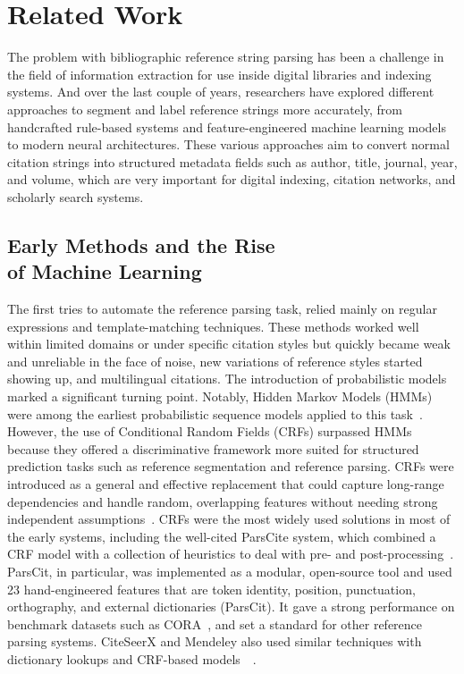 \chapter{Related Work}
\label{ch:related}

The problem with bibliographic reference string parsing has been a challenge in the field of information extraction for use inside digital libraries and indexing systems. And over the last couple of years, researchers have explored different approaches to segment and label reference strings more accurately, from handcrafted rule-based systems and feature-engineered machine learning models to modern neural architectures. These various approaches aim to convert normal citation strings into structured metadata fields such as author, title, journal, year, and volume, which are very important for digital indexing, citation networks, and scholarly search systems.

\section[Early Methods and the Rise of Machine Learning]{Early Methods and the Rise\\ of Machine Learning}
The first tries to automate the reference parsing task, relied mainly on regular expressions and template-matching techniques. These methods worked well within limited domains or under specific citation styles but quickly became weak and unreliable in the face of noise, new variations of reference styles started showing up, and multilingual citations. The introduction of probabilistic models marked a significant turning point. Notably, Hidden Markov Models (HMMs) were among the earliest probabilistic sequence models applied to this task~\cite{HMM1165342}.
However, the use of Conditional Random Fields (CRFs) surpassed HMMs because they offered a discriminative framework more suited for structured prediction tasks such as reference segmentation and reference parsing. CRFs were introduced as a general and effective replacement that could capture long-range dependencies and handle random, overlapping features without needing strong independent assumptions~\cite{crf2001}. CRFs were the most widely used solutions in most of the early systems, including the well-cited ParsCite system, which combined a CRF model with a collection of heuristics to deal with pre- and post-processing~\cite{councill-etal-2008-parscit}.
ParsCit, in particular, was implemented as a modular, open-source tool and used 23 hand-engineered features that are token identity, position, punctuation, orthography, and external dictionaries (ParsCit). It gave a strong performance on benchmark datasets such as CORA~\cite{cora1999}, and set a standard for other reference parsing systems. CiteSeerX and Mendeley also used similar techniques with dictionary lookups and CRF-based models~\cite{councill-etal-2008-parscit}~\cite{citeseerx}.

